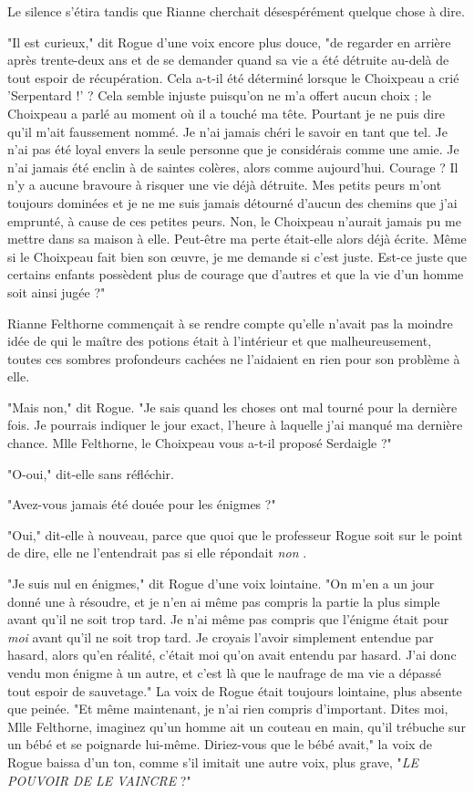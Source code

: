 Le silence s'étira tandis que Rianne cherchait désespérément quelque chose à dire.

"Il est curieux," dit Rogue d'une voix encore plus douce, "de regarder en arrière après trente-deux ans et de se demander quand sa vie a été détruite au-delà de tout espoir de récupération. Cela a-t-il été déterminé lorsque le Choixpeau a crié 'Serpentard !' ? Cela semble injuste puisqu'on ne m'a offert aucun choix ; le Choixpeau a parlé au moment où il a touché ma tête. Pourtant je ne puis dire qu'il m'ait faussement nommé. Je n'ai jamais chéri le savoir en tant que tel. Je n'ai pas été loyal envers la seule personne que je considérais comme une amie. Je n'ai jamais été enclin à de saintes colères, alors comme aujourd'hui. Courage ? Il n'y a aucune bravoure à risquer une vie déjà détruite. Mes petits peurs m'ont toujours dominées et je ne me suis jamais détourné d'aucun des chemins que j'ai emprunté, à cause de ces petites peurs. Non, le Choixpeau n'aurait jamais pu me mettre dans sa maison à elle. Peut-être ma perte était-elle alors déjà écrite. Même si le Choixpeau fait bien son œuvre, je me demande si c'est juste. Est-ce juste que certains enfants possèdent plus de courage que d'autres et que la vie d'un homme soit ainsi jugée ?"

Rianne Felthorne commençait à se rendre compte qu'elle n'avait pas la moindre idée de qui le maître des potions était à l'intérieur et que malheureusement, toutes ces sombres profondeurs cachées ne l'aidaient en rien pour son problème à elle.

"Mais non," dit Rogue. "Je sais quand les choses ont mal tourné pour la dernière fois. Je pourrais indiquer le jour exact, l'heure à laquelle j'ai manqué ma dernière chance. Mlle Felthorne, le Choixpeau vous a-t-il proposé Serdaigle ?"

"O-oui," dit-elle sans réfléchir.

"Avez-vous jamais été douée pour les énigmes ?"

"Oui," dit-elle à nouveau, parce que quoi que le professeur Rogue soit sur le point de dire, elle ne l'entendrait pas si elle répondait \emph{non} .

"Je suis nul en énigmes," dit Rogue d'une voix lointaine. "On m'en a un jour donné une à résoudre, et je n'en ai même pas compris la partie la plus simple avant qu'il ne soit trop tard. Je n'ai même pas compris que l'énigme était pour \emph{moi}  avant qu'il ne soit trop tard. Je croyais l'avoir simplement entendue par hasard, alors qu'en réalité, c'était moi qu'on avait entendu par hasard. J'ai donc vendu mon énigme à un autre, et c'est là que le naufrage de ma vie a dépassé tout espoir de sauvetage." La voix de Rogue était toujours lointaine, plus absente que peinée. "Et même maintenant, je n'ai rien compris d'important. Dites moi, Mlle Felthorne, imaginez qu'un homme ait un couteau en main, qu'il trébuche sur un bébé et se poignarde lui-même. Diriez-vous que le bébé avait," la voix de Rogue baissa d'un ton, comme s'il imitait une autre voix, plus grave, "\emph{LE POUVOIR DE LE VAINCRE}  ?"

